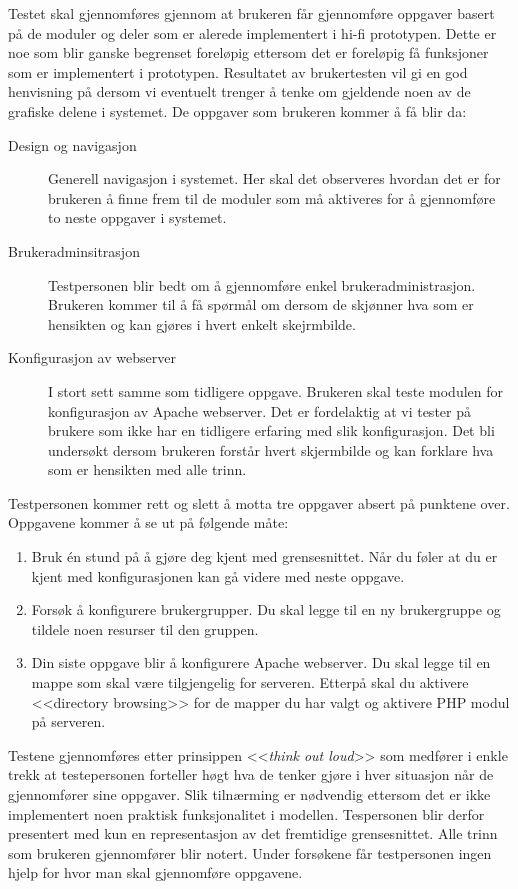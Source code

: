Testet skal gjennomføres gjennom at brukeren får gjennomføre oppgaver basert på de moduler og deler som er alerede implementert i hi-fi prototypen. Dette er noe som blir ganske begrenset foreløpig ettersom det er foreløpig få funksjoner som er implementert i prototypen. 
Resultatet av brukertesten vil gi en god henvisning på dersom  vi eventuelt trenger å tenke om gjeldende noen av de grafiske delene i systemet. 
De oppgaver som brukeren kommer å få blir da:
\begin{description}
\item[Design og navigasjon]
Generell navigasjon i systemet. Her skal det observeres hvordan det er for brukeren å finne frem til de moduler som må aktiveres for å gjennomføre to neste oppgaver i systemet.
\item[Brukeradminsitrasjon]
Testpersonen blir bedt om å gjennomføre enkel brukeradministrasjon. Brukeren kommer til å få spørmål om dersom de skjønner hva som er hensikten og kan gjøres i hvert enkelt skejrmbilde.
\item[Konfigurasjon av webserver]
I stort sett samme som tidligere oppgave. Brukeren skal teste modulen for konfigurasjon av Apache webserver. Det er fordelaktig at vi tester på brukere som ikke har en tidligere erfaring med slik konfigurasjon. Det bli undersøkt dersom brukeren forstår hvert skjermbilde og kan forklare hva som er hensikten med alle trinn.
\end{description}
Testpersonen kommer rett og slett å motta tre oppgaver absert på punktene over. Oppgavene kommer å se ut på følgende måte:
\begin{enumerate}
\setlength{\itemsep}{1pt}
\setlength{\parskip}{0pt}
\setlength{\parsep}{0pt}

\item Bruk én stund på å gjøre deg kjent med grensesnittet. Når du føler at du er kjent med konfigurasjonen kan gå videre med neste oppgave.
\item Forsøk å konfigurere brukergrupper. Du skal legge til en ny brukergruppe og tildele noen resurser til den gruppen.
\item Din siste oppgave blir å konfigurere Apache webserver. Du skal legge til en mappe som skal være tilgjengelig for serveren. Etterpå skal du aktivere <<directory browsing>> for de mapper du har valgt og aktivere PHP modul på serveren.
\end{enumerate}

Testene gjennomføres etter prinsippen <<\textit{think out loud}>> som medfører i enkle trekk at testepersonen forteller høgt hva de tenker gjøre i hver situasjon når de gjennomfører sine oppgaver. Slik tilnærming er nødvendig ettersom det er ikke implementert noen praktisk funksjonalitet i modellen. Tespersonen blir derfor presentert med kun en representasjon av det fremtidige grensesnittet. Alle trinn som brukeren gjennomfører blir notert. Under forsøkene får testpersonen ingen hjelp for hvor man skal gjennomføre oppgavene.

